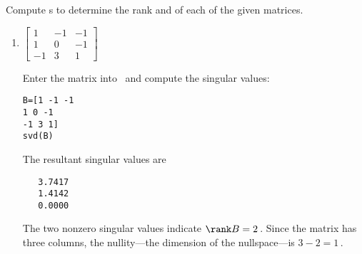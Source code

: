 \begin{example} 
Compute \svd{}s to determine the rank and  of each of the given matrices.
\begin{enumerate}
 
\item \(\begin{bmatrix} 1&-1&-1
\\1&0&-1
\\-1&3&1 \end{bmatrix}\)
\begin{solution} 
Enter the matrix into \script\ and compute the singular values:
\begin{verbatim}
B=[1 -1 -1
1 0 -1
-1 3 1]
svd(B)
\end{verbatim}
\setbox\ajrqrbox\hbox{}%
\marginajrbox%
The resultant singular values are
\begin{verbatim}
   3.7417
   1.4142
   0.0000
\end{verbatim}
The two nonzero singular values indicate  \(\rank B=2\)\,.
Since the matrix has three columns, the nullity---the dimension of the nullspace---is \(3-2=1\)\,. 
\end{solution}



\end{enumerate}
\end{example}
